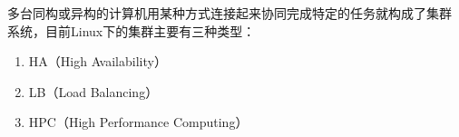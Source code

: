 多台同构或异构的计算机用某种方式连接起来协同完成特定的任务就构成了集群
系统，目前Linux下的集群主要有三种类型：

\begin{enumerate}[itemsep=0pt,parsep=0pt]
\item HA（High Availability）
\item LB（Load Balancing）
\item HPC（High Performance Computing）
\end{enumerate}











